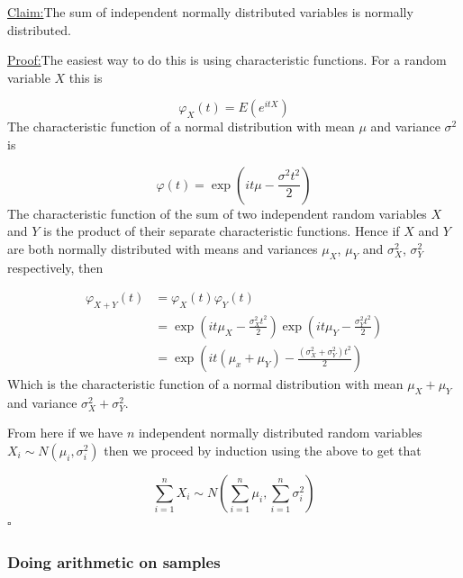 \documentclass[a4paper]{article}
\renewcommand{\qed}{\hfill\ensuremath{\square}}
\newenvironment{claim}[1]{\par\noindent\underline{Claim:}\space#1}{}
\newenvironment{claimproof}[1]{\par\noindent\underline{Proof:}\space#1}{\qed}
\begin{document}
\begin{mdframed}
	\begin{claim}
		The sum of independent normally distributed variables is normally distributed.
	\end{claim}
	\begin{claimproof}
		The easiest way to do this is using characteristic functions. For a random variable \(X\) this is

		\[\varphi_X(t) = E(e^{itX})\]
		The characteristic function of a normal distribution with mean \(\mu\) and variance \(\sigma^2\) is

		\[\varphi(t) = \exp(i t \mu - \frac{\sigma^2 t^2}{2})\]
		The characteristic function of the sum of two independent random variables \(X\) and \(Y\) is the product of their separate characteristic functions. Hence if \(X\) and \(Y\) are both normally distributed with means and variances \(\mu_X\), \(\mu_Y\) and \(\sigma_X^2\), \(\sigma_Y^2\) respectively, then

		\begin{align*}
			\varphi_{X+Y}(t)
			& = \varphi_X(t) \varphi_Y(t) \\
			& = \exp\left(i t \mu_X - \frac{\sigma_X^2 t^2}{2}\right) \exp\left(i t \mu_Y - \frac{\sigma_Y^2 t^2}{2}\right) \\
			& = \exp\left(i t (\mu_x + \mu_Y) - \frac{(\sigma_X^2 + \sigma_Y^2) t^2}{2}\right)
		\end{align*}
		Which is the characteristic function of a normal distribution with mean \(\mu_X + \mu_Y\) and variance \(\sigma_X^2 + \sigma_Y^2\).

		From here if we have \(n\) independent normally distributed random variables \(X_i \sim N(\mu_i, \sigma_i^2)\) then we proceed by induction using the above to get that

		\[\sum_{i=1}^n X_i \sim N(\sum_{i=1}^n \mu_i, \sum_{i=1}^n \sigma_i^2)\]
	\end{claimproof}
\end{mdframed}




\subsubsection{Doing arithmetic on samples}
\end{document}
